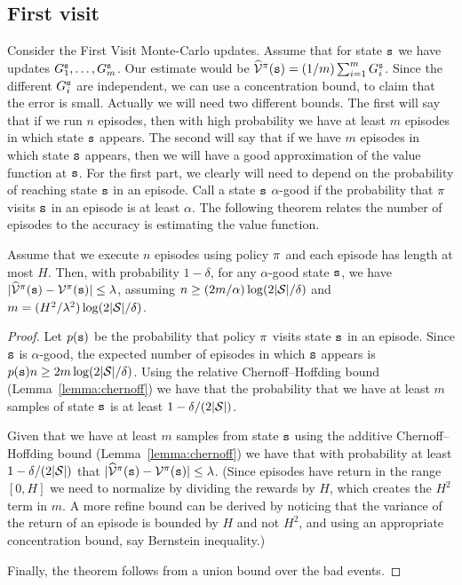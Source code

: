 \subsection{First visit}

Consider the First Visit Monte-Carlo updates. Assume that for state
${\tt s}$ we have updates $G_1^{\tt s}, \ldots , G^{\tt s}_m$. Our
estimate would be
$\widehat{\mathcal{V}}^\pi({\tt s})=(1/m)\sum_{i=1}^m G^{\tt s}_i$.
Since the different $G^{\tt s}_i$ are independent, we can use a
concentration bound, to claim that the error is small. Actually we
will need two different bounds. The first will say that if we run
$n$ episodes, then with high probability we have at least $m$
episodes in which state ${\tt s}$ appears. The second will say that if
we have $m$ episodes in which state ${\tt s}$ appears, then we will
have a good approximation of the value function at ${\tt s}$. For the first part,
we clearly will need to depend on the probability of reaching state
${\tt s}$ in an episode. Call a state ${\tt s}$ $\alpha$-good if
the probability that $\pi$ visits ${\tt s}$ in an episode is at
least $\alpha$.
The following theorem relates the number of episodes to the accuracy
is estimating the value function.

\begin{theorem}
Assume that we execute $n$ episodes using policy $\pi$ and each
episode has length at most $H$. Then, with probability $1-\delta$,
for any $\alpha$-good state ${\tt s}$, we have
$|\widehat{\mathcal{V}}^\pi({\tt s})-\mathcal{V}^\pi({\tt s})|\leq
\lambda$, assuming $n\geq (2m/\alpha)\log(2|\mathcal{S}|/\delta)$ and
$m=(H^2/\lambda^2)\log(2|\mathcal{S}|/\delta)$.
\end{theorem}

\begin{proof}
Let $p({\tt s})$ be the probability that policy $\pi$ visits
state ${\tt s}$ in an episode. Since ${\tt s}$ is $\alpha$-good, the
expected number of episodes in which ${\tt s}$ appears is
$p({\tt s})n\geq 2m\log(2|\mathcal{S}|/\delta)$. Using the relative
Chernoff--Hoffding bound (Lemma~\ref{lemma:chernoff}) we have that
the probability that we have at least $m$ samples of state ${\tt s}$
is at least $1-\delta/(2|\mathcal{S}|)$.

Given that we have at least $m$ samples from state ${\tt s}$ using
the additive Chernoff--Hoffding bound (Lemma~\ref{lemma:chernoff})
we have that with probability at least $1-\delta/(2|\mathcal{S}|)$ that
$|\widehat{\mathcal{V}}^\pi({\tt s})-\mathcal{V}^\pi({\tt s})|\leq
\lambda$. (Since episodes have return in the range $[0,H]$ we need
to normalize by dividing the rewards by $H$, which creates the $H^2$
term in $m$. A more refine bound can be derived by noticing that the
variance of the return of an episode is bounded by $H$ and not
$H^2$, and using an appropriate concentration bound, say Bernstein
inequality.)

Finally, the theorem follows from a union bound over the bad events.
\end{proof}


